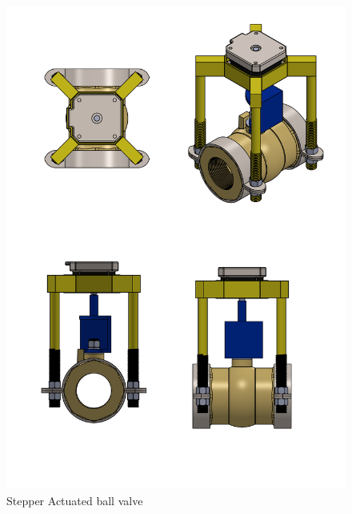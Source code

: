 \begin{enumerate}
\begin{enumerate}
    \begin{figure}[H]
        \centering
        \includegraphics{Figures/ActuatedBallValve.PNG}
        \caption{Stepper Actuated ball valve}
        \label{fig:stepper_actuated_ball_valve}
    \end{figure}
    

\end{enumerate}
\end{enumerate}
